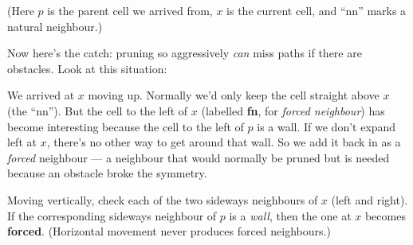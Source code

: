 \documentclass[11pt,a4paper]{article}
\newcommand{\gridbase}[2]{%
  \draw[step=0.6,gray!50,very thin] (0,0) grid (#1*0.6,#2*0.6);
  \draw[black,thick] (0,0) rectangle (#1*0.6,#2*0.6);
}
\newcommand{\fillcell}[3]{%
  \fill[#3] (#1*0.6,#2*0.6) rectangle ({(#1+1)*0.6},{(#2+1)*0.6});
  \draw[gray!50,very thin] (#1*0.6,#2*0.6) rectangle ({(#1+1)*0.6},{(#2+1)*0.6});
}
\newcommand{\celltext}[3]{%
  \node at ({(#1+0.5)*0.6},{(#2+0.5)*0.6}) {\footnotesize #3};
}
\begin{document}
\begin{center}
\end{center}

\noindent (Here $p$ is the parent cell we arrived from, $x$ is the current cell, and ``nn'' marks a natural neighbour.)

Now here's the catch: pruning so aggressively \emph{can} miss paths if there are obstacles. Look at this situation:

\begin{center}
\end{center}

\noindent We arrived at $x$ moving up. Normally we'd only keep the cell straight above $x$ (the ``nn''). But the cell to the left of $x$ (labelled \textbf{fn}, for \emph{forced neighbour}) has become interesting because the cell to the left of $p$ is a wall. If we don't expand left at $x$, there's no other way to get around that wall. So we add it back in as a \emph{forced} neighbour --- a neighbour that would normally be pruned but is needed because an obstacle broke the symmetry.

\begin{keybox}
Moving vertically, check each of the two sideways neighbours of $x$ (left and right). If the corresponding sideways neighbour of $p$ is a \emph{wall}, then the one at $x$ becomes \textbf{forced}. (Horizontal movement never produces forced neighbours.)
\end{keybox}
\end{document}
